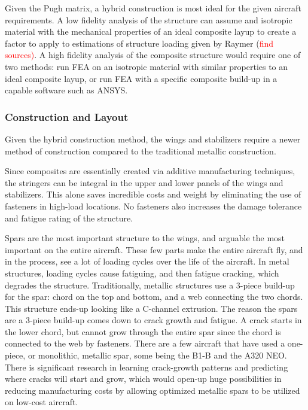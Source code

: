 
Given the Pugh matrix, a hybrid construction is most ideal for the given aircraft requirements. A low fidelity analysis of the structure can assume and isotropic material with the mechanical properties of an ideal composite layup to create a factor to apply to estimations of structure loading given by Raymer (\textcolor{red}{find sources)}. A high fidelity analysis of the composite structure would require one of two methods: run FEA on an isotropic material with similar properties to an ideal composite layup, or run FEA with a specific composite build-up in a capable software such as ANSYS.

\subsubsection{Construction and Layout}
Given the hybrid construction method, the wings and stabilizers require a newer method of construction compared to the traditional metallic construction. 

Since composites are essentially created via additive manufacturing techniques, the stringers can be integral in the upper and lower panels of the wings and stabilizers. This alone saves incredible costs and weight by eliminating the use of fasteners in high-load locations. No fasteners also increases the damage tolerance and fatigue rating of the structure.

Spars are the most important structure to the wings, and arguable the most important on the entire aircraft. These few parts make the entire aircraft fly, and in the process, see a lot of loading cycles over the life of the aircraft. In metal structures, loading cycles cause fatiguing, and then fatigue cracking, which degrades the structure. Traditionally, metallic structures use a 3-piece build-up for the spar: chord on the top and bottom, and a web connecting the two chords. This structure ends-up looking like a C-channel extrusion. The reason the spars are a 3-piece build-up comes down to crack growth and fatigue. A crack starts in the lower chord, but cannot grow through the entire spar since the chord is connected to the web by fasteners. There are a few aircraft that have used a one-piece, or monolithic, metallic spar, some being the B1-B and the A320 NEO. There is significant research in learning crack-growth patterns and predicting where cracks will start and grow, which would open-up huge possibilities in reducing manufacturing costs by allowing optimized metallic spars to be utilized on low-cost aircraft.

